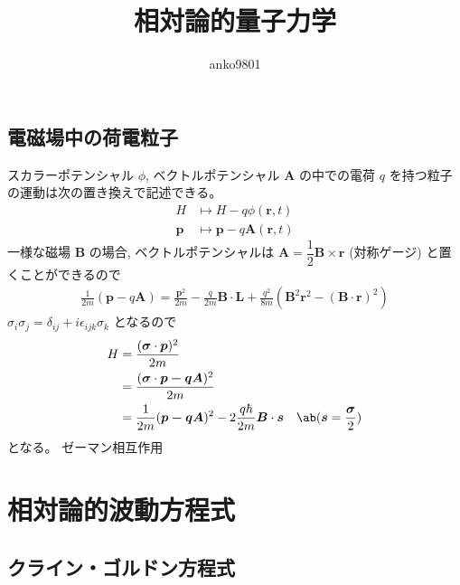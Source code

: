 \documentclass[uplatex,dvipdfmx,a4paper,11pt]{jlreq}
\title{相対論的量子力学}
\author{anko9801}
\newcommand{\rr}{\bm{r}}
\numberwithin{equation}{section}
\theoremstyle{definition}
\begin{document}
\maketitle
\tableofcontents
\clearpage

\subsection{電磁場中の荷電粒子}
スカラーポテンシャル $\phi$, ベクトルポテンシャル $\bm{A}$ の中での電荷 $q$ を持つ粒子の運動は次の置き換えで記述できる。
\begin{align}
  H      & \mapsto H - q\phi(\rr, t)        \\
  \bm{p} & \mapsto \bm{p} - q\bm{A}(\rr, t)
\end{align}
一様な磁場 $\bm{B}$ の場合, ベクトルポテンシャルは $\bm{A} = \dfrac{1}{2}\bm{B}\times\rr$ (対称ゲージ) と置くことができるので
\begin{align}
  \frac{1}{2m}(\bm{p} - q\bm{A}) = \frac{\bm{p}^2}{2m} - \frac{q}{2m}\bm{B}\cdot\bm{L} + \frac{q^2}{8m}(\bm{B}^2\rr^2 - (\bm{B}\cdot\rr)^2)
\end{align}
$\sigma_i\sigma_j = \delta_{ij} + i\epsilon_{ijk}\sigma_k$ となるので
\begin{align}
  H & = \frac{(\bm{\sigma}\cdot\bm{p})^2}{2m}                                                                        \\
    & = \frac{(\bm{\sigma}\cdot\bm{p - q\bm{A}})^2}{2m}                                                              \\
    & = \frac{1}{2m}(\bm{p - q\bm{A}})^2 - 2\frac{q\hbar}{2m}\bm{B}\cdot\bm{s} & \ab(\bm{s} = \frac{\bm{\sigma}}{2})
\end{align}
となる。
ゼーマン相互作用

\section{相対論的波動方程式}
\subsection{クライン・ゴルドン方程式}
\end{document}
